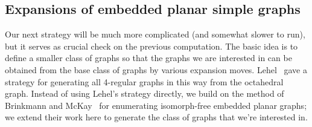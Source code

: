 \documentclass[amsmath,secnumarabic,amssymb,floatfix,nofootinbib,nobibnotes,letterpaper,11pt,tightenlines,showkeys]{revtex4}
\theoremstyle{definition}
\begin{document}
\subsection{Expansions of embedded planar simple graphs}

Our next strategy will be much more complicated (and somewhat slower to run), but it serves as crucial check on the previous computation. The basic idea is to define a smaller class of graphs so that the graphs we are interested in can be obtained from the base class of graphs by various expansion moves. Lehel~\cite{JGT:JGT3190050412} gave a strategy for generating all 4-regular graphs in this way from the octahedral graph. Instead of using Lehel's strategy directly, we build on the method of Brinkmann and McKay~\cite{Brinkmann:2007up,McKay:1998wa} for enumerating isomorph-free embedded planar graphs; we extend their work here to generate the class of graphs that we're interested in.
\end{document}
